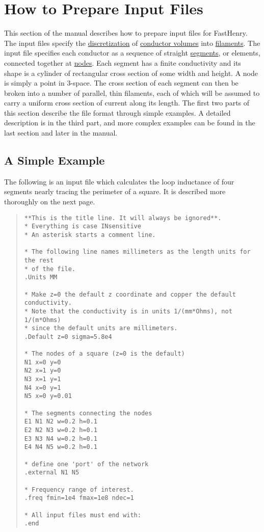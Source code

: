 \setcounter{page}{1}



\section{How to Prepare Input Files}
\label{all}

This section of the manual describes how to prepare input files for
FastHenry.  The input files specify the \underline{discretization} of
\underline{conductor volumes} into \underline{filaments}.  
The input file specifies each conductor as a sequence of straight
\underline{segments}, or elements, connected together at
\underline{nodes}.  Each segment has a finite conductivity and its
shape is a cylinder of rectangular cross
section of some width and height. A node is simply a point in
3-space.  The cross section of each segment can then be broken into a 
number of parallel, thin filaments, each of which will be assumed to
carry a uniform cross section of current along its length.
The first two parts of this section describe the file format through
simple examples. A detailed description is in the third part, and more
complex examples can be found in the last section and later in the manual.

\subsection{A Simple Example}

The following is an input file
which calculates the loop inductance of four segments 
nearly tracing the perimeter of a square.  It is described more
thoroughly on the next page.

\begin{quote}
\begin{verbatim}  
**This is the title line. It will always be ignored**. 
* Everything is case INsensitive
* An asterisk starts a comment line.

* The following line names millimeters as the length units for the rest 
* of the file.
.Units MM

* Make z=0 the default z coordinate and copper the default conductivity.
* Note that the conductivity is in units 1/(mm*Ohms), not 1/(m*Ohms)
* since the default units are millimeters.
.Default z=0 sigma=5.8e4

* The nodes of a square (z=0 is the default)
N1 x=0 y=0
N2 x=1 y=0
N3 x=1 y=1
N4 x=0 y=1
N5 x=0 y=0.01

* The segments connecting the nodes
E1 N1 N2 w=0.2 h=0.1
E2 N2 N3 w=0.2 h=0.1
E3 N3 N4 w=0.2 h=0.1
E4 N4 N5 w=0.2 h=0.1

* define one 'port' of the network
.external N1 N5

* Frequency range of interest.
.freq fmin=1e4 fmax=1e8 ndec=1

* All input files must end with:
.end
\end{verbatim}
\end{quote}

